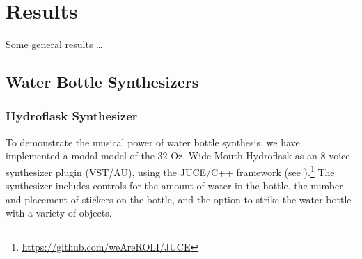 \documentclass[twoside,a4paper]{article}
\begin{document}
\section{Results} \label{sec:results}
%
Some general results \dots
%
\subsection{Water Bottle Synthesizers} \label{sec:synth}

\subsubsection{Hydroflask Synthesizer}
To demonstrate the musical power of water bottle synthesis, we have
implemented a modal model of the 32 Oz. Wide Mouth Hydroflask
as an 8-voice synthesizer plugin (VST/AU), using the JUCE/C++
framework (see ).\footnote{\url{https://github.com/weAreROLI/JUCE}}
The synthesizer includes controls for the amount of water in the bottle,
the number and placement of stickers on the bottle, and the option to
strike the water bottle with a variety of objects. 
\end{document}
